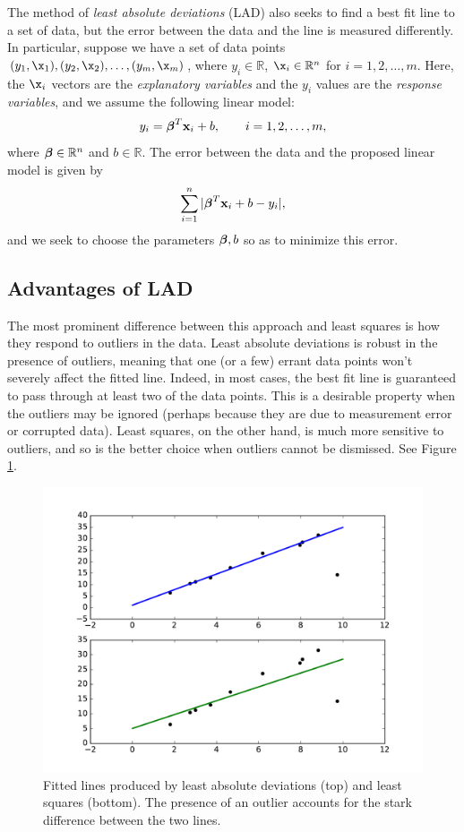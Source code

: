 The method of \emph{least absolute deviations} (LAD) also seeks to find a best fit line to a set of data, but the error between the data and the line is measured differently.
In particular, suppose we have a set of data points $(y_1, \x_1), (y_2, \x_2), \ldots, (y_m, \x_m)$, where $y_i \in \mathbb{R}$, $\x_i \in \mathbb{R}^n$ for $i = 1, 2, \ldots, m$.
Here, the $\x_i$ vectors are the \emph{explanatory variables} and the $y_i$ values are the \emph{response variables}, and we assume the following linear model:
\[
y_i = \boldsymbol{\beta}^T\mathbf{x}_i + b, \qquad i = 1, 2, \ldots, m,
\]
where $\boldsymbol{\beta}\in\mathbb{R}^n$ and $b \in \mathbb{R}$.
The error between the data and the proposed linear model is given by
\[
\sum_{i=1}^n |\boldsymbol{\beta}^T\mathbf{x}_i + b - y_i|,
\]
and we seek to choose the parameters $\boldsymbol{\beta}, b$ so as to minimize this error.

\subsection*{Advantages of LAD}
The most prominent difference between this approach and least squares is how they respond to outliers in the data.
Least absolute deviations is robust in the presence of outliers, meaning that one (or a few) errant data points won't severely affect the fitted line.
Indeed, in most cases, the best fit line is guaranteed to pass through at least two of the data points.
This is a desirable property when the outliers may be ignored (perhaps because they are due to measurement error or corrupted data).
Least squares, on the other hand, is much more sensitive to outliers, and so is the better choice when outliers cannot be dismissed.
See Figure \ref{fig:leastAbsDev}.

\begin{figure}
\centering
\includegraphics[width=\textwidth]{leastAbsDev.pdf}
\caption{Fitted lines produced by least absolute deviations (top) and least squares (bottom). The presence of an outlier accounts for the
stark difference between the two lines.}
\label{fig:leastAbsDev}
\end{figure}

